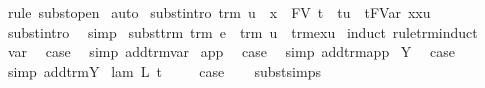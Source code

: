 \begin{isabellebody}
\isamarkupfalse%
\isanewline
{}\isamarkupfalse%
\ {\isacharparenleft}rule\ subst{\isacharunderscore}open{\isacharparenright}\isanewline
{}\isamarkupfalse%
\ auto%
\endisatagproof
{\isafoldproof}%
%
\isadelimproof
\isanewline
%
\endisadelimproof
\isanewline
{}\isamarkupfalse%
\ subst{\isacharunderscore}intro{}{\isacharcolon}\ {\isachardoublequoteopen}trm\ u\ {\isasymLongrightarrow}\ x\ {\isasymnotin}\ FV\ t\ {\isasymLongrightarrow}\ t{\isacharcircum}u\ {\isacharequal}\ {\isacharparenleft}t{\isacharcircum}FVar\ x{\isacharparenright}{\isacharbrackleft}x{\isacharcolon}{\isacharcolon}{\isacharequal}u{\isacharbrackright}{\isachardoublequoteclose}\ \isanewline
%
\isadelimproof
%
\endisadelimproof
%
\isatagproof
{}\isamarkupfalse%
\ subst{\isacharunderscore}intro\ \isamarkupfalse%
\ simp%
\endisatagproof
{\isafoldproof}%
%
\isadelimproof
\isanewline
%
\endisadelimproof
\isanewline
{}\isamarkupfalse%
\ subst{\isacharunderscore}trm{\isacharcolon}\ {\isachardoublequoteopen}trm\ e\ {\isasymLongrightarrow}\ trm\ u\ {\isasymLongrightarrow}\ trm{\isacharparenleft}e{\isacharbrackleft}x{\isacharcolon}{\isacharcolon}{\isacharequal}u{\isacharbrackright}{\isacharparenright}{\isachardoublequoteclose}\isanewline
%
\isadelimproof
%
\endisadelimproof
%
\isatagproof
{}\isamarkupfalse%
\ {\isacharparenleft}induct\ rule{\isacharcolon}trm{\isachardot}induct{\isacharparenright}\isanewline
{}\isamarkupfalse%
\ var\ \isamarkupfalse%
\ {\isacharquery}case\ \isamarkupfalse%
\ {\isacharparenleft}simp\ add{\isacharcolon}trm{\isachardot}var{\isacharparenright}\isanewline
{}\isamarkupfalse%
\isanewline
{}\isamarkupfalse%
\ app\ \isamarkupfalse%
\ {\isacharquery}case\ \isamarkupfalse%
\ {\isacharparenleft}simp\ add{\isacharcolon}trm{\isachardot}app{\isacharparenright}\isanewline
{}\isamarkupfalse%
\isanewline
{}\isamarkupfalse%
\ Y\ \isamarkupfalse%
\ {\isacharquery}case\ \isamarkupfalse%
\ {\isacharparenleft}simp\ add{\isacharcolon}trm{\isachardot}Y{\isacharparenright}\isanewline
{}\isamarkupfalse%
\isanewline
{}\isamarkupfalse%
\ {\isacharparenleft}lam\ L\ t{\isacharparenright}\ \isanewline
\ \ \isamarkupfalse%
\ {\isacharquery}case\isanewline
\ \ \isamarkupfalse%
\ subst{\isachardot}simps\isanewline
\ \ \isamarkupfalse%

\end{isabellebody}
